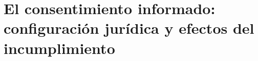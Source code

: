 %
%

\section{El consentimiento informado: configuración jurídica y efectos del incumplimiento}
\label{sec:consentimiento}


